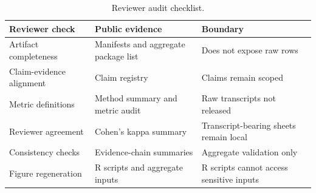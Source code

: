 \begin{table}[htbp]
\centering
\caption{Reviewer audit checklist.}
\label{tab:reviewer_checklist}
\begin{tabularx}{\linewidth}{@{}LLL@{}}
\toprule
Reviewer check & Public evidence & Boundary \\
\midrule
Artifact completeness & Manifests and aggregate package list & Does not expose raw rows \\
Claim-evidence alignment & Claim registry & Claims remain scoped \\
Metric definitions & Method summary and metric audit & Raw transcripts not released \\
Reviewer agreement & Cohen's kappa summary & Transcript-bearing sheets remain local \\
Consistency checks & Evidence-chain summaries & Aggregate validation only \\
Figure regeneration & R scripts and aggregate inputs & R scripts cannot access sensitive inputs \\
\bottomrule
\end{tabularx}
\end{table}
